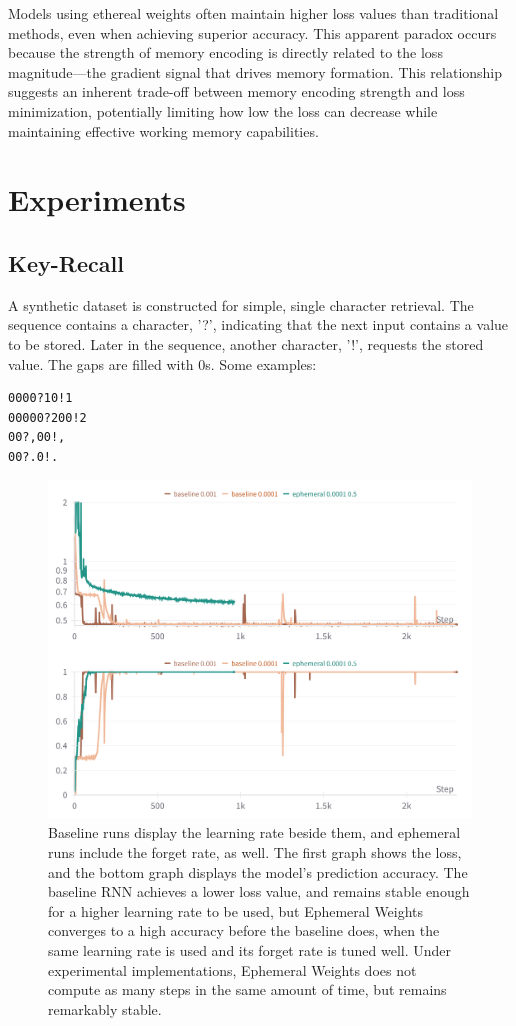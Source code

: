 \documentclass{article} %
\begin{document}
Models using ethereal weights often maintain higher loss values than traditional methods, even when achieving superior accuracy. This apparent paradox occurs because the strength of memory encoding is directly related to the loss magnitude—the gradient signal that drives memory formation. This relationship suggests an inherent trade-off between memory encoding strength and loss minimization, potentially limiting how low the loss can decrease while maintaining effective working memory capabilities.

\section{Experiments}

\subsection{Key-Recall}
A synthetic dataset is constructed for simple, single character retrieval. The sequence contains a character, '?', indicating that the next input contains a value to be stored. Later in the sequence, another character, '!', requests the stored value. The gaps are filled with 0s. Some examples:
\begin{verbatim}
0000?10!1
00000?200!2
00?,00!,
00?.0!.
\end{verbatim}

\begin{figure}[h]
\begin{center}
\includegraphics[width=0.8\linewidth]{figure_1.png}
\caption{Baseline runs display the learning rate beside them, and ephemeral runs include the forget rate, as well. The first graph shows the loss, and the bottom graph displays the model's prediction accuracy. The baseline RNN achieves a lower loss value, and remains stable enough for a higher learning rate to be used, but Ephemeral Weights converges to a high accuracy before the baseline does, when the same learning rate is used and its forget rate is tuned well. Under experimental implementations, Ephemeral Weights does not compute as many steps in the same amount of time, but remains remarkably stable.}
\label{fig:key_recall}
\end{center}
\end{figure}
\end{document}
